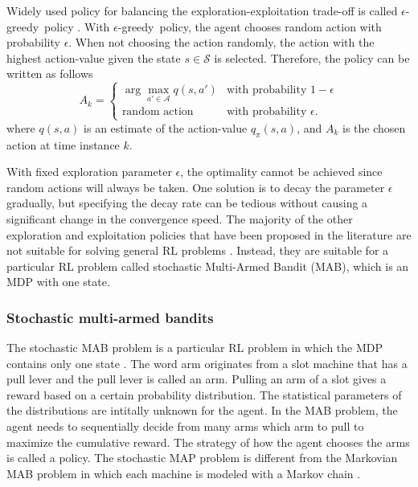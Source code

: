 \documentclass[english, 12pt, a4paper, elec, utf8, a-1b, online]{aaltothesis}
\newcommand{\Ss}{\mathcal{S}}
\newcommand{\As}{\mathcal{A}}
\newcommand{\egreedy}{$\epsilon$-greedy~}
\begin{document}
Widely used policy for balancing the exploration-exploitation trade-off is called \egreedy policy \cite{Sutton2018}.
With \egreedy policy, the agent chooses random action with probability $\epsilon$.
When not choosing the action randomly, the action with the highest action-value given the state $s \in \Ss$ is selected.
Therefore, the policy can be written as follows
\begin{equation}\label{eq:epsilon_greedy}
    A_k =
    \left\{
        \begin{array}{ll}
            \arg\max_{a' \in \As} q(s, a') & \text{with probability $1-\epsilon$}\\
            \text{random action} & \text{with probability $\epsilon$}.
        \end{array}
    \right.
\end{equation}
where $q(s, a)$ is an estimate of the action-value $q_\pi(s, a)$, and $A_k$ is the chosen action at time instance $k$.

With fixed exploration parameter $\epsilon$, the optimality cannot be achieved since random actions will always be taken.
One solution is to decay the parameter $\epsilon$ gradually, but specifying the decay rate can be tedious without causing a significant change in the convergence speed.
The majority of the other exploration and exploitation policies that have been proposed in the literature are not suitable for solving general RL problems \cite{Sutton2018}.
Instead, they are suitable for a particular RL problem called stochastic Multi-Armed Bandit (MAB), which is an MDP with one state.

\subsubsection{Stochastic multi-armed bandits}\label{sec:MAB}

The stochastic MAB problem is a particular RL problem in which the MDP contains only one state \cite{Sutton2018}.
The word arm originates from a slot machine that has a pull lever and the pull lever is called an arm.
Pulling an arm of a slot gives a reward based on a certain probability distribution. 
The statistical parameters of the distributions are intitally unknown for the agent.
In the MAB problem, the agent needs to sequentially decide from many arms which arm to pull to maximize the cumulative reward.
The strategy of how the agent chooses the arms is called a policy.
The stochastic MAP problem is different from the Markovian MAB problem in which each machine is modeled with a Markov chain \cite{Katehakis1987}.
\end{document}
